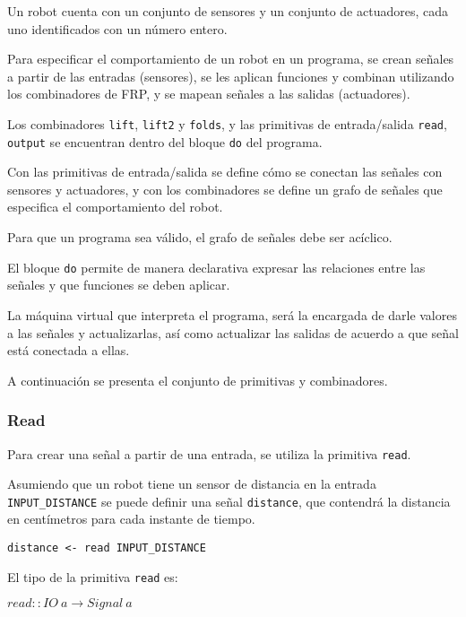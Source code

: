 
  Un robot cuenta con un conjunto de sensores y un conjunto de actuadores,
cada uno identificados con un número entero.

  Para especificar el comportamiento de un robot en un programa, se crean
señales a partir de las entradas (sensores), se les aplican funciones
y combinan utilizando los combinadores de FRP, y se mapean señales
a las salidas (actuadores).

  Los combinadores \texttt{lift}, \texttt{lift2} y \texttt{folds},
y las primitivas de entrada/salida \texttt{read}, \texttt{output} se
encuentran dentro del bloque \texttt{do} del programa.

  Con las primitivas de entrada/salida se define cómo se conectan
las señales con sensores y actuadores, y con los combinadores se
define un grafo de señales que especifica el comportamiento del robot.
  
  Para que un programa sea válido, el grafo de señales debe ser acíclico.

  El bloque \texttt{do} permite de manera declarativa expresar las
relaciones entre las señales y que funciones se deben aplicar.

  La máquina virtual que interpreta el programa, será la encargada de
darle valores a las señales y actualizarlas, así como actualizar las
salidas de acuerdo a que señal está conectada a ellas.

  A continuación se presenta el conjunto de primitivas y combinadores.

\subsubsection{Read}
  Para crear una señal a partir de una entrada, se utiliza la
primitiva \texttt{read}.

  Asumiendo que un robot tiene un sensor de distancia en la entrada
\texttt{INPUT\_DISTANCE} se puede definir una señal \texttt{distance},
que contendrá la distancia en centímetros para cada instante de tiempo.

\begin{center}
\begin{Verbatim}[frame=single]
distance <- read INPUT_DISTANCE
\end{Verbatim}
\end{center}

El tipo de la primitiva \texttt{read} es:

\begin{center}
  $read :: IO\ a \rightarrow Signal\ a $
\end{center}


